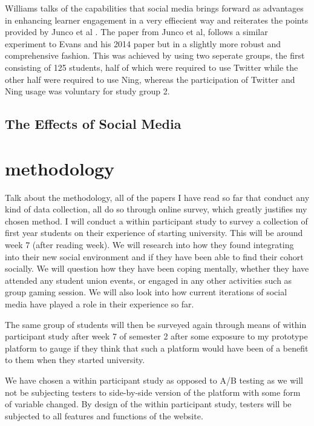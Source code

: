 \documentclass[lettersize,journal]{IEEEtran}
\begin{document}
Williams \cite{Williams2022} talks of the capabilities that social media brings
forward as advantages in enhancing learner engagement in a very effiecient way
and reiterates the points provided by Junco et al \cite{Junco et al 2013}.
The paper from Junco et al, follows a similar experiment to Evans and his 2014
paper \cite{Evans2014} but in a slightly more robust and comprehensive fashion.
This was achieved by using two seperate groups, the first consisting of 125
students, half of which were required to use Twitter while the other half were
required to use Ning, whereas the participation of Twitter and Ning usage was
voluntary for study group 2.

\subsection{The Effects of Social Media}

\section{methodology}
Talk about the methodology, all of the papers I have read so far that conduct
any kind of data collection, all do so through online survey, which greatly
justifies my chosen method.
I will conduct a within participant study to survey a collection of first year
students on their experience of starting university. This will be around week
7 (after reading week). We will research into how they found
integrating into their new social environment and if they have been able to
find their cohort socially. We will question how they have been
coping mentally, whether they have attended any student union
events, or engaged in any other activities such as group
gaming session. We will also look into how current
iterations of social media have played a role in their
experience so far.

The same group of students will then be surveyed again
through means of within participant study after week 7 of
semester 2 after some exposure to my prototype platform to gauge if they think
that such a platform would have been of a benefit to them when they
started university.

We have chosen a within participant study as opposed to A/B
testing as we will not be subjecting testers to side-by-side
version of the platform with some form of variable
changed. By design of the within participant study,
testers will be subjected to all features and functions of the
website.
\end{document}
